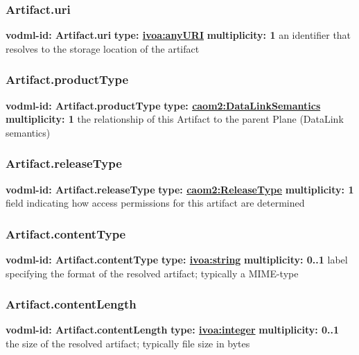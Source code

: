     \subsubsection{Artifact.uri}
      \textbf{vodml-id: Artifact.uri} \newline
      \textbf{type: \hyperref[sect:ivoa]{ivoa:anyURI}} \newline
      \textbf{multiplicity: 1} \newline
      an identifier that resolves to the storage location of the artifact

    \subsubsection{Artifact.productType}
      \textbf{vodml-id: Artifact.productType} \newline
      \textbf{type: \hyperref[sect:DataLinkSemantics]{caom2:DataLinkSemantics}} \newline
      \textbf{multiplicity: 1} \newline
      the relationship of this Artifact to the parent Plane (DataLink semantics)

    \subsubsection{Artifact.releaseType}
      \textbf{vodml-id: Artifact.releaseType} \newline
      \textbf{type: \hyperref[sect:ReleaseType]{caom2:ReleaseType}} \newline
      \textbf{multiplicity: 1} \newline
      field indicating how access permissions for this artifact are determined

    \subsubsection{Artifact.contentType}
      \textbf{vodml-id: Artifact.contentType} \newline
      \textbf{type: \hyperref[sect:ivoa]{ivoa:string}} \newline
      \textbf{multiplicity: 0..1} \newline
      label specifying the format of the resolved artifact; typically a MIME-type

    \subsubsection{Artifact.contentLength}
      \textbf{vodml-id: Artifact.contentLength} \newline
      \textbf{type: \hyperref[sect:ivoa]{ivoa:integer}} \newline
      \textbf{multiplicity: 0..1} \newline
      the size of the resolved artifact; typically file size in bytes

